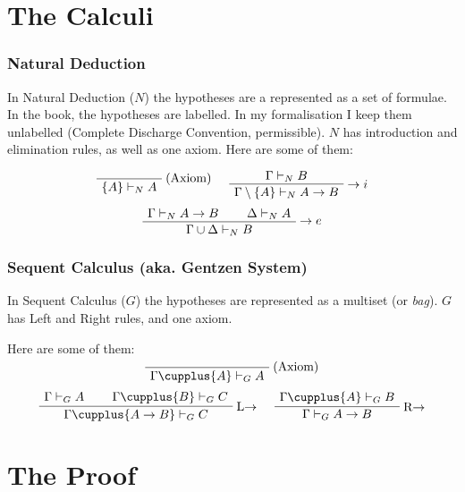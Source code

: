 \documentclass[english,svgnames,hide notes,12pt]{beamer}
\theoremstyle{definition}
\theoremstyle{remark}
\begin{document}
\section{The Calculi}

\begin{frame}
    \frametitle{Natural Deduction}
    In Natural Deduction ($N$) the hypotheses are a represented as a set of formulae. In the book, the hypotheses are labelled. In my formalisation I keep them unlabelled (Complete Discharge Convention, permissible). $N$ has introduction and elimination rules, as well as one axiom. Here are some of them:


    \[
        \AxiomC{}
        \RightLabel{(Axiom)}
        \UnaryInfC{$\{A\} \vdash_N A$}
        \DisplayProof
        \hspace{0.5cm}
        \AxiomC{$\Gamma \vdash_N B$}
        \RightLabel{$\to i$}
        \UnaryInfC{$\Gamma\setminus\{A\}\vdash_N A\to B$}
        \DisplayProof
    \]
    \[
        \AxiomC{$\Gamma\vdash_N A\to B$}
        \AxiomC{$\Delta\vdash_N A$}
        \RightLabel{$\to e$}
        \BinaryInfC{$\Gamma\cup\Delta\vdash_N B$}
        \DisplayProof
    \]
\end{frame}


\begin{frame}
    \frametitle{Sequent Calculus (aka. Gentzen System)}
    In Sequent Calculus ($G$) the hypotheses are represented as a multiset (or \emph{bag}). $G$ has Left and Right rules, and one axiom.

    Here are some of them:
    \[
        \AxiomC{}
        \RightLabel{(Axiom)}
        \UnaryInfC{$\Gamma \cupplus \{A\}\vdash_G A$}
        \DisplayProof
    \]
    \[
        \AxiomC{$\Gamma\vdash_G A$}
        \AxiomC{$\Gamma\cupplus\{B\}\vdash_G C$}
        \RightLabel{L$\to$}
        \BinaryInfC{$\Gamma\cupplus\{A\to B\}\vdash_G C$}
        \DisplayProof
        \hspace{0.5cm}
        \AxiomC{$\Gamma\cupplus\{A\}\vdash_G B$}
        \RightLabel{R$\to$}
        \UnaryInfC{$\Gamma\vdash_G A\to B$}
        \DisplayProof
    \]
\end{frame}

\section{The Proof}
\end{document}
